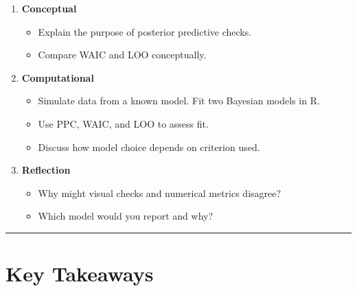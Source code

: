 \documentclass[
  letterpaper,
  DIV=11,
  numbers=noendperiod]{scrreprt}
\providecommand{\tightlist}{%
  \setlength{\itemsep}{0pt}\setlength{\parskip}{0pt}}
\begin{document}
\begin{enumerate}
\def\labelenumi{\arabic{enumi}.}
\tightlist
\item
  \textbf{Conceptual}

  \begin{itemize}
  \tightlist
  \item
    Explain the purpose of posterior predictive checks.\\
  \item
    Compare WAIC and LOO conceptually.
  \end{itemize}
\item
  \textbf{Computational}

  \begin{itemize}
  \tightlist
  \item
    Simulate data from a known model. Fit two Bayesian models in R.\\
  \item
    Use PPC, WAIC, and LOO to assess fit.\\
  \item
    Discuss how model choice depends on criterion used.
  \end{itemize}
\item
  \textbf{Reflection}

  \begin{itemize}
  \tightlist
  \item
    Why might visual checks and numerical metrics disagree?\\
  \item
    Which model would you report and why?
  \end{itemize}
\end{enumerate}

\begin{center}\rule{0.5\linewidth}{0.5pt}\end{center}

\section{Key Takeaways}\label{key-takeaways}
\end{document}
